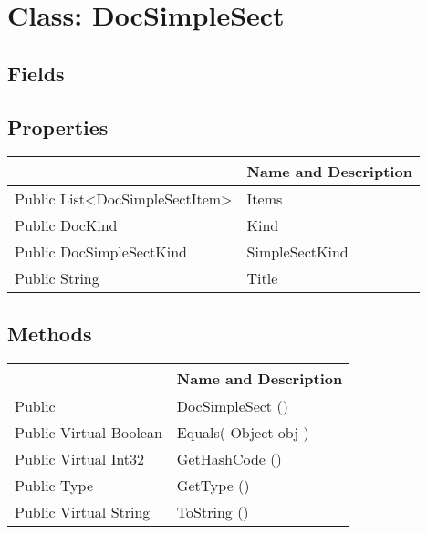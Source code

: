 \documentclass[11pt, oneside, a4paper]{book}
\begin{document}
\hypertarget{SoftwareEngineeringTools.{}Documentation.{}DocSimpleSect}{}
\section{Class: DocSimpleSect}

\subsection{Fields}

\subsection{Properties}
\begin{center}
\begin{tabular}{| p{3cm} | p{12cm} | }
\hline
\textbf{ } & \textbf{ Name and Description}\\
\hline
 Public  List<DocSimpleSectItem> &  Items\hypertarget{SoftwareEngineeringTools.{}Documentation.{}DocSimpleSect.{}Items}{}\\
\hline
 Public  DocKind &  Kind\hypertarget{SoftwareEngineeringTools.{}Documentation.{}DocSimpleSect.{}Kind}{}\\
\hline
 Public  DocSimpleSectKind &  SimpleSectKind\hypertarget{SoftwareEngineeringTools.{}Documentation.{}DocSimpleSect.{}SimpleSectKind}{}\\
\hline
 Public  String &  Title\hypertarget{SoftwareEngineeringTools.{}Documentation.{}DocSimpleSect.{}Title}{}\\
\hline
\end{tabular}
\end{center}

\subsection{Methods}
\begin{center}
\begin{tabular}{| p{3cm} | p{12cm} | }
\hline
\textbf{ } & \textbf{ Name and Description}\\
\hline
 Public  &  DocSimpleSect ()\hypertarget{SoftwareEngineeringTools.{}Documentation.{}DocSimpleSect.{}DocSimpleSect}{}\\
\hline
 Public  Virtual  Boolean &  Equals(\hypertarget{SoftwareEngineeringTools.{}Documentation.{}DocSimpleSect.{}Equals\_Object}{} Object  obj  )\\
\hline
 Public  Virtual  Int32 &  GetHashCode ()\hypertarget{SoftwareEngineeringTools.{}Documentation.{}DocSimpleSect.{}GetHashCode}{}\\
\hline
 Public  Type &  GetType ()\hypertarget{SoftwareEngineeringTools.{}Documentation.{}DocSimpleSect.{}GetType}{}\\
\hline
 Public  Virtual  String &  ToString ()\hypertarget{SoftwareEngineeringTools.{}Documentation.{}DocSimpleSect.{}ToString}{}\\
\hline
\end{tabular}
\end{center}
 
\end{document}
